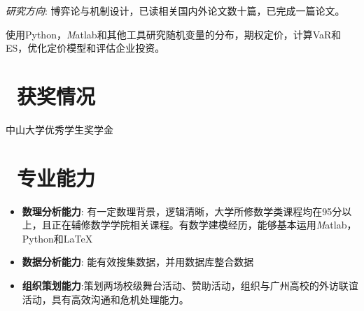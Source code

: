 \documentclass[10pt]{resume}
\begin{document}

\textit{研究方向}: 博弈论与机制设计，已读相关国内外论文数十篇，已完成一篇论文。


使用Python，\textit{M}atlab和其他工具研究随机变量的分布，期权定价，计算VaR和ES，优化定价模型和评估企业投资。

\section{\faHeartO\ 获奖情况}
中山大学优秀学生奖学金


\section{\faInfo\ 专业能力}
\begin{itemize}[parsep=0.5ex]
  \item \textbf{数理分析能力}: 有一定数理背景，逻辑清晰，大学所修数学类课程均在95分以上，且正在辅修数学学院相关课程。有数学建模经历，能够基本运用\textit{M}atlab，Python和\LaTeX
  \item \textbf{数据分析能力}: 能有效搜集数据，并用数据库整合数据
  \item  \textbf{组织策划能力}:策划两场校级舞台活动、赞助活动，组织与广州高校的外访联谊活动，具有高效沟通和危机处理能力。 
\end{itemize}

%
%
\end{document}
